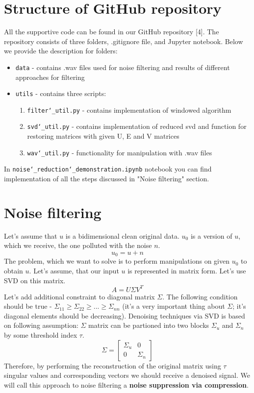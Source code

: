 \section{Structure of GitHub repository}
All the supportive code can be found in our GitHub repository [4].
The repository consists of three folders, .gitignore file, and Jupyter notebook.
Below we provide the description for folders:
\begin{itemize}
	\item \texttt{data} - contains .wav files used for noise filtering and results of different approaches for filtering
	\item \texttt{utils} - contains three scripts:
		\begin{enumerate}
			\item \texttt{filter\char`_util.py} - contains implementation of windowed algorithm
			\item \texttt{svd\char`_util.py} - contains implementation of reduced svd and function for restoring matrices with given U, E and V matrices
			\item \texttt{wav\char`_util.py} - functionality for manipulation with .wav files
		\end{enumerate}
\end{itemize}
In \texttt{noise\char`_reduction\char`_demonstration.ipynb} notebook you can find implementation of all the steps discussed in "Noise filtering" section.

\section{Noise filtering}
 Let's assume that $u$ is a bidimensional clean original data. $u_0$ is a version of $u$, which we receive, the one polluted with the noise $n$.
\[
	u_0 = u + n
\]
The problem, which we want to solve is to perform manipulations on given $u_0$ to obtain $u$.
Let's assume, that our input $u$ is represented in matrix form. Let's use SVD on this matrix.
\[
	A = U\Sigma V^T
\]
Let's add additional constraint to diagonal matrix $\Sigma$. The following condition should be true - $\Sigma_{11} \geq \Sigma_{22} \geq ... \geq \Sigma_{nn} $ (it's a very important thing about $\Sigma$; it's diagonal elements should be decreasing).
\newline
Denoising techniques via SVD is based on following assumption: $\Sigma$ matrix can be partioned into two blocks $\Sigma_u$ and $\Sigma_n$ by some threshold index $\tau$. 
\[
\Sigma=
\begin{bmatrix}
\Sigma_u & 0 \\
0 & \Sigma_n
\end{bmatrix}
\]
Therefore, by performing the reconstruction of the original matrix using $\tau$  singular values and corresponding vectors we should receive a denoised signal.
\newline
We will call this approach to noise filtering a \textbf{noise suppression via compression}.
\newline
